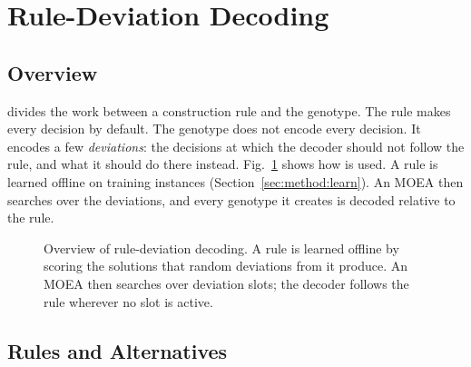 \section{Rule-Deviation Decoding}
\label{sec:method}


\subsection{Overview}
\label{sec:method:overview}

\RDD divides the work between a construction rule and the genotype.
The rule makes every decision by default.
The genotype does not encode every decision.
It encodes a few \emph{deviations}: the decisions at which the decoder should not follow the rule, and what it should do there instead.
Fig.~\ref{fig:framework} shows how \RDD is used.
A rule is learned offline on training instances (Section~\ref{sec:method:learn}).
An MOEA then searches over the deviations, and every genotype it creates is decoded relative to the rule.

\begin{figure}[t]
  \centering
  \caption{Overview of rule-deviation decoding. A rule is learned offline by scoring the solutions that random deviations from it produce. An MOEA then searches over deviation slots; the decoder follows the rule wherever no slot is active.}
  \label{fig:framework}
\end{figure}

\subsection{Rules and Alternatives}
\label{sec:method:rule}

